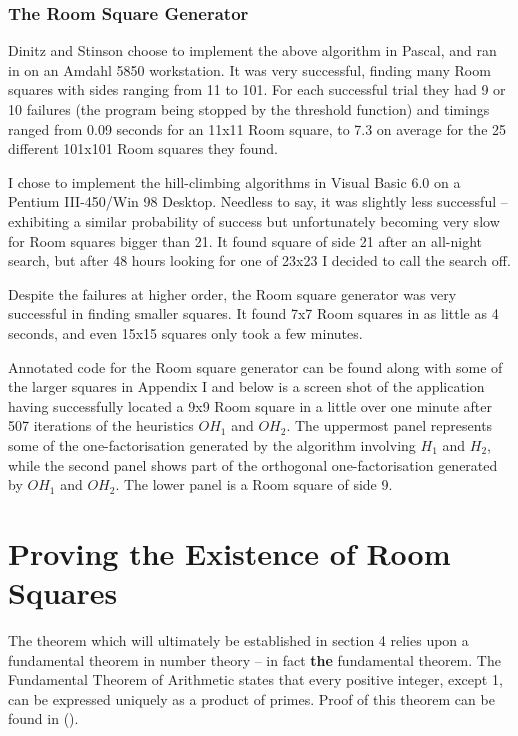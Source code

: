 \documentclass[
  11pt,
  a4paper]{book}
\begin{document}
\hypertarget{the-room-square-generator}{%
\subsection{The Room Square Generator}\label{the-room-square-generator}}

Dinitz and Stinson choose to implement the above algorithm in
Pascal, and ran in on an Amdahl 5850 workstation. It was very
successful, finding many Room squares with sides ranging from 11
to 101. For each successful trial they had 9 or 10 failures (the
program being stopped by the threshold function) and timings
ranged from 0.09 seconds for an 11x11 Room square, to 7.3 on
average for the 25 different 101x101 Room squares they found.

I chose to implement the hill-climbing algorithms in Visual Basic
6.0 on a Pentium III-450/Win 98 Desktop. Needless to say, it was
slightly less successful -- exhibiting a similar probability of
success but unfortunately becoming very slow for Room squares
bigger than 21. It found square of side 21 after an all-night
search, but after 48 hours looking for one of 23x23 I decided to
call the search off.

Despite the failures at higher order, the Room square generator
was very successful in finding smaller squares. It found 7x7 Room
squares in as little as 4 seconds, and even 15x15 squares only
took a few minutes.

Annotated code for the Room square generator can be found along
with some of the larger squares in Appendix I and below is a
screen shot of the application having successfully located a 9x9
Room square in a little over one minute after 507 iterations of
the heuristics \(OH_1\) and \(OH_2\). The uppermost panel represents
some of the one-factorisation generated by the algorithm involving
\(H_1\) and \(H_2\), while the second panel shows part of the
orthogonal one-factorisation generated by \(OH_1\) and \(OH_2\). The
lower panel is a Room square of side 9.

\hypertarget{proving-the-existence-of-room-squares}{%
\chapter{Proving the Existence of Room Squares}\label{proving-the-existence-of-room-squares}}

The theorem which will ultimately be established in section
4 relies upon a fundamental theorem in number theory -- in
fact \textbf{the} fundamental theorem. The Fundamental Theorem of
Arithmetic states that every positive integer, except 1, can
be expressed uniquely as a product of primes. Proof of this
theorem can be found in (\textcite{hardy_introduction_1979}).
\end{document}
